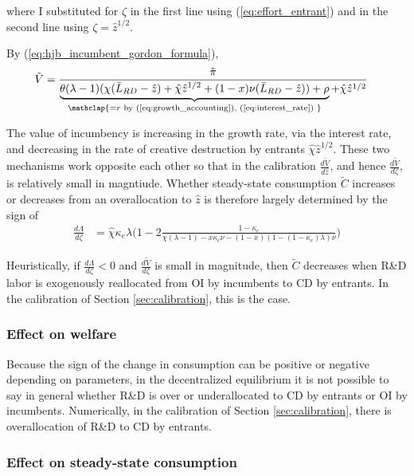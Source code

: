 where I substituted for $\zeta$ in the first line using (\ref{eq:effort_entrant}) and in the second line using $\zeta = \hat{z}^{1/2}$. 

By (\ref{eq:hjb_incumbent_gordon_formula}),
\begin{align}
\tilde{V} &= \frac{\tilde{\pi}}{\underbrace{\theta (\lambda -1) (\chi (\bar{L}_{RD} - \hat{z}) + \hat{\chi} \hat{z}^{1/2} + (1-x) \nu (\bar{L}_{RD} - \hat{z})) + \rho}_{\mathclap{= r\text{ by (\ref{eq:growth_accounting}), (\ref{eq:interest_rate}) }} }  + \hat{\chi} \hat{z}^{1/2}} 
\end{align}

The value of incumbency is increasing in the growth rate, via the interest rate, and decreasing in the rate of creative destruction by entrants $\hat{\chi} \hat{z}^{1/2}$. These two mechanisms work opposite each other so that in the calibration $\frac{d\tilde{V}}{d\hat{z}}$, and hence $\frac{d\tilde{V}}{d\zeta}$, is relatively small in magntiude. Whether steady-state consumption $\tilde{C}$ increases or decreases from an overallocation to $\hat{z}$ is therefore largely determined by the sign of 
\begin{align}
\frac{d\Lambda}{d\zeta} &= \hat{\chi} \kappa_e \lambda \Big( 1 - 2\frac{1-\kappa_e}{\chi(\lambda -1) - x \kappa_c \nu - (1-x) (1 - (1-\kappa_e) \lambda) \nu }\Big)
\end{align} 

Heuristically, if $\frac{d\Lambda}{d\zeta} < 0$ and $\frac{d\tilde{V}}{d\zeta}$ is small in magnitude, then $\tilde{C}$ decreases when R\&D labor is exogenously reallocated from OI by incumbents to CD by entrants. In the calibration of Section \ref{sec:calibration}, this is the case.

\subsubsection{Effect on welfare}

Because the sign of the change in consumption can be positive or negative depending on parameters, in the decentralized equilibrium it is not possible to say in general whether R\&D is over or underallocated to CD by entrants or OI by incumbents. Numerically, in the calibration of Section \ref{sec:calibration}, there is overallocation of R\&D to CD by entrants. 





\subsubsection{Effect on steady-state consumption}

